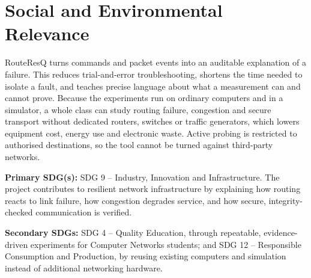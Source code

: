 \documentclass[12pt,a4paper]{report}
\numberwithin{equation}{chapter}
\begin{document}
\section{Social and Environmental Relevance}
RouteResQ turns commands and packet events into an auditable explanation of a failure. This reduces trial-and-error troubleshooting, shortens the time needed to isolate a fault, and teaches precise language about what a measurement can and cannot prove. Because the experiments run on ordinary computers and in a simulator, a whole class can study routing failure, congestion and secure transport without dedicated routers, switches or traffic generators, which lowers equipment cost, energy use and electronic waste. Active probing is restricted to authorised destinations, so the tool cannot be turned against third-party networks.

\textbf{Primary SDG(s):} SDG 9 -- Industry, Innovation and Infrastructure. The project contributes to resilient network infrastructure by explaining how routing reacts to link failure, how congestion degrades service, and how secure, integrity-checked communication is verified.

\textbf{Secondary SDGs:} SDG 4 -- Quality Education, through repeatable, evidence-driven experiments for Computer Networks students; and SDG 12 -- Responsible Consumption and Production, by reusing existing computers and simulation instead of additional networking hardware.
\end{document}
